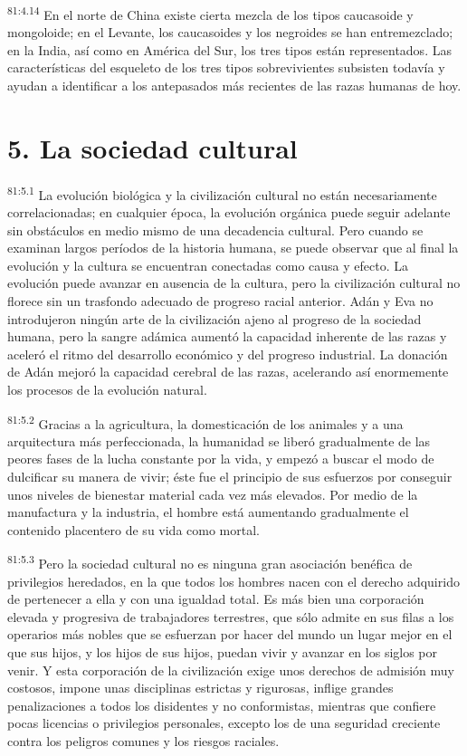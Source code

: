 \documentclass[twoside, 11pt]{book}
\begin{document}
\par
\textsuperscript{81:4.14} En el norte de China existe cierta mezcla de los tipos caucasoide y mongoloide; en el Levante, los caucasoides y los negroides se han entremezclado; en la India, así como en América del Sur, los tres tipos están representados. Las características del esqueleto de los tres tipos sobrevivientes subsisten todavía y ayudan a identificar a los antepasados más recientes de las razas humanas de hoy.

\section*{5. La sociedad cultural}
\par
\textsuperscript{81:5.1} La evolución biológica y la civilización cultural no están necesariamente correlacionadas; en cualquier época, la evolución orgánica puede seguir adelante sin obstáculos en medio mismo de una decadencia cultural. Pero cuando se examinan largos períodos de la historia humana, se puede observar que al final la evolución y la cultura se encuentran conectadas como causa y efecto. La evolución puede avanzar en ausencia de la cultura, pero la civilización cultural no florece sin un trasfondo adecuado de progreso racial anterior. Adán y Eva no introdujeron ningún arte de la civilización ajeno al progreso de la sociedad humana, pero la sangre adámica aumentó la capacidad inherente de las razas y aceleró el ritmo del desarrollo económico y del progreso industrial. La donación de Adán mejoró la capacidad cerebral de las razas, acelerando así enormemente los procesos de la evolución natural.

\par
\textsuperscript{81:5.2} Gracias a la agricultura, la domesticación de los animales y a una arquitectura más perfeccionada, la humanidad se liberó gradualmente de las peores fases de la lucha constante por la vida, y empezó a buscar el modo de dulcificar su manera de vivir; éste fue el principio de sus esfuerzos por conseguir unos niveles de bienestar material cada vez más elevados. Por medio de la manufactura y la industria, el hombre está aumentando gradualmente el contenido placentero de su vida como mortal.

\par
\textsuperscript{81:5.3} Pero la sociedad cultural no es ninguna gran asociación benéfica de privilegios heredados, en la que todos los hombres nacen con el derecho adquirido de pertenecer a ella y con una igualdad total. Es más bien una corporación elevada y progresiva de trabajadores terrestres, que sólo admite en sus filas a los operarios más nobles que se esfuerzan por hacer del mundo un lugar mejor en el que sus hijos, y los hijos de sus hijos, puedan vivir y avanzar en los siglos por venir. Y esta corporación de la civilización exige unos derechos de admisión muy costosos, impone unas disciplinas estrictas y rigurosas, inflige grandes penalizaciones a todos los disidentes y no conformistas, mientras que confiere pocas licencias o privilegios personales, excepto los de una seguridad creciente contra los peligros comunes y los riesgos raciales.
\end{document}
